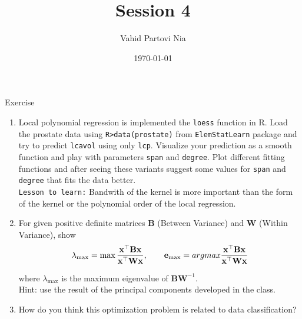 \documentclass[
size=12pt,
paper=screen,
mode=handout,
style=simple,
nopagebreaks,
fleqn
]{powerdot}
\title{Session 4}
\author{Vahid Partovi Nia}
\date{\today}
\def \argmax{\mathrm {argmax}}
\def \t{^{\top}}
\begin{document}
Exercise\\
\begin{slide}{}
\begin{enumerate}
\item Local polynomial regression is implemented the \texttt{\color{blue}loess} function in R. Load the prostate data using \texttt{\color{blue}R>data(prostate)} from \texttt{\color{blue}ElemStatLearn} package and try to predict \texttt{\color{blue}lcavol} using only \texttt{\color{blue}lcp}. Visualize your prediction as a smooth function and play with parameters \texttt{\color{blue}span} and \texttt{\color{blue}degree}. Plot different fitting functions and after seeing these variants suggest some values for \texttt{\color{blue}span} and \texttt{\color{blue}degree} that fits the data better.\\
\vspace{0.2in}
{ \texttt{\color{red}Lesson to learn:} Bandwith of the kernel is more important than the form of the kernel or the polynomial order of the local regression.}
\end{enumerate}
\end{slide}

\begin{slide}{}
\begin{enumerate}
    \setcounter{enumi}{1}

   \item For given positive definite matrices $\mathbf B$ (Between Variance) and $\mathbf W$ (Within Variance), show $$ \lambda_\mathrm{max}=\max {\mathbf x\t \mathbf B \mathbf x \over \mathbf x\t \mathbf W \mathbf x}, \quad\quad\mathbf{e}_{\mathrm{max}}=\mathbf \argmax {\mathbf x\t \mathbf B \mathbf x \over \mathbf x\t \mathbf W \mathbf x}  $$
   
     where $\lambda_{\mathrm {max}}$ is the maximum eigenvalue of $\mathbf B\mathbf W^{-1}$. \\
    Hint: use the result of the principal components developed in the class.    

 \vspace{0.2in}
  \item How do you think this optimization problem is related to data classification? 
  \end{enumerate}


\end{slide}
\end{document}
